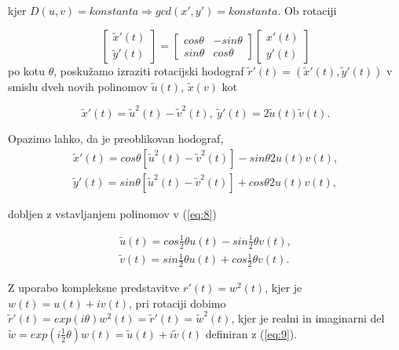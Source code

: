 \documentclass[a4paper]{IEEEtran}
\begin{document}
	kjer $D(u,v)=konstanta \Rightarrow gcd(x\prime ,y\prime )=konstanta$. Ob rotaciji
	
	\begin{equation}
	\begin{bmatrix}
	\widetilde{x} \prime (t) \\
	\widetilde{y} \prime (t)
	\end{bmatrix}
	=
	\begin{bmatrix}
	cos \theta & -sin\theta \\
	sin\theta & cos\theta
	\end{bmatrix}
	\begin{bmatrix}
	x \prime (t) \\
	y \prime (t)
	\end{bmatrix}
	\end{equation}
	po kotu $\theta$, poskužamo izraziti rotacijski hodograf $\widetilde{r} \prime (t) = (\widetilde{x} \prime (t),\widetilde{y} \prime (t))$ v smislu dveh novih polinomov $\widetilde{u} (t)$, $\widetilde{x} (v)$ kot
	
	\begin{equation} \label{eq:8}
	\widetilde{x} \prime (t) = \widetilde{u}^2 (t) - \widetilde{v}^2 (t), \ \widetilde{y} \prime (t) = 2 \widetilde{u} (t) \widetilde{v} (t).
	\end{equation}
	
	Opazimo lahko, da je preoblikovan hodograf,
	\begin{eqnarray}
	\widetilde{x} \prime (t) = cos \theta [\widetilde{u}^2 (t) - \widetilde{v}^2 (t)] - sin\theta 2u(t)v(t), \nonumber \\
	\widetilde{y} \prime (t) = sin \theta [\widetilde{u}^2 (t) - \widetilde{v}^2 (t)] + cos\theta 2u(t)v(t),
	\end{eqnarray}

	dobljen z vstavljanjem polinomov v (\ref{eq:8})
	
	\begin{eqnarray}\label{eq:9}
	\widetilde{u} (t)=cos\frac{1}{2}\theta u(t)-sin\frac{1}{2}\theta v(t), \nonumber \\
	\widetilde{v} (t)=sin\frac{1}{2}\theta u(t)+cos\frac{1}{2}\theta v(t). 
	\end{eqnarray}
	
	Z uporabo kompleksne predstavitve $r\prime (t)=w^2(t)$, kjer je $w(t)=u(t)+iv(t)$, pri rotaciji dobimo $\widetilde{r}\prime (t)=exp(i\theta )w^2(t)=\widetilde{r}\prime (t)=\widetilde{w}^2 (t)$, kjer je realni in imaginarni del $\widetilde{w}=exp(i\frac{1}{2}\theta )w(t)=\widetilde{u} (t)+ i\widetilde{v} (t)$ definiran z (\ref{eq:9}).
	
\end{document}
